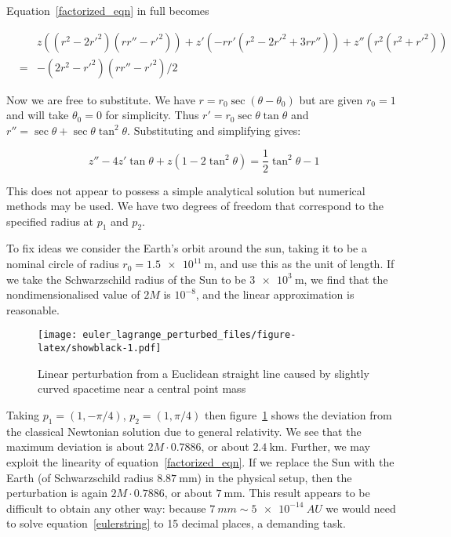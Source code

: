 \documentclass[pdflatex,sn-mathphys-num]{sn-jnl}%
\theoremstyle{thmstyleone}%
\theoremstyle{thmstyletwo}%
\theoremstyle{thmstylethree}%
\begin{document}
Equation~\ref{factorized_eqn} in full becomes

\begin{eqnarray}
  &{}&
  z   \left((r^2 - 2r'^2)(rr''-r'^2)\right)
  +z'  \left(-rr'(r^2 - 2r'^2 + 3rr'')\right)
  +z'' \left(r^2    (r^2+r'^2)       \right)\nonumber\\
 &=& -(2r^2-r'^2)(rr''-r'^2)/2
\end{eqnarray}

Now we are free to substitute.  We have $r=r_0\sec(\theta-\theta_0)$
but are given $r_0=1$ and will take $\theta_0=0$ for simplicity.  Thus
$r'= r_0\sec\theta\tan\theta$ and
$r''=\sec\theta+\sec\theta\tan^2\theta$.  Substituting and simplifying
gives:

\begin{equation}\label{string_ODE}
z'' - 4z'\tan \theta + z(1-2\tan^2\theta) = {\scriptstyle\frac{1}{2}}\tan^2\theta - 1
\end{equation}

This does not appear to possess a simple analytical solution but
numerical methods may be used.  We have two degrees of freedom that
correspond to the specified radius at $p_1$ and $p_2$.

To fix ideas we consider the Earth's orbit around the sun, taking it
to be a nominal circle of radius $r_0 = \qty{1.5e11}{\m}$,
and use this as the unit of length.  If we take the Schwarzschild
radius of the Sun to be $\qty{3e3}{\m}$, we find that the
nondimensionalised value of $2M$ is $10^{-8}$, and the linear
approximation is reasonable.

\begin{figure}[h]
\centering %
\texttt{[image: euler\_lagrange\_perturbed\_files/figure-latex/showblack-1.pdf]}
\caption{Linear perturbation from a Euclidean straight line caused by slightly curved spacetime 
  near a central point mass}
\label{showblack}
\end{figure}
 
Taking $p_1=(1,-\pi/4)$, $p_2=(1,\pi/4)$ then figure~\ref{showblack}
shows the deviation from the classical Newtonian solution due to
general relativity.  We see that the maximum deviation is about
$2M\cdot 0.7886$, or about $\qty{2.4}{\km}$.  Further, we may exploit
the linearity of equation~\ref{factorized_eqn}.  If we replace the Sun
with the Earth (of Schwarzschild radius $\qty{8.87}{\mm}$) in the
physical setup, then the perturbation is again $2M\cdot 0.7886$, or
about $\qty{7}{\mm}$.  This result appears to be difficult to obtain
any other way: because $\qty{7}{mm}\sim\qty{5e-14}{AU}$ we would need
to solve equation~\ref{eulerstring} to 15 decimal places, a demanding
task.
\end{document}
